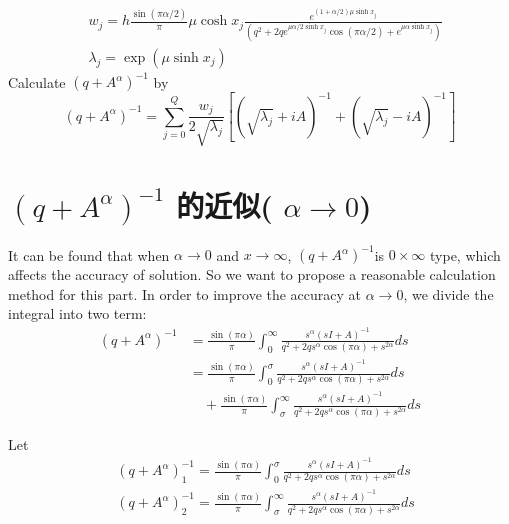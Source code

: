 \begin{breakablealgorithm}
\begin{algorithmic}[1]
		\begin{equation*}
			\begin{aligned}
				&w_j=h\frac{\sin(\pi \alpha/2)}{\pi}\mu\cosh x_j\frac{e^{(1+\alpha/2)\mu\sinh x_j }}{(q^2+2q e^{\mu \alpha/2 \sinh x_j}\cos(\pi\alpha/2)+e^{\mu\alpha\sinh x_j})}\\
				&\lambda_j=\exp(\mu\sinh x_j)
			\end{aligned}
		\end{equation*}
		\ENDIF
		\STATE  Calculate $(q+A^{\alpha})^{-1}$ by 
		\begin{equation}
			(q+{A}^{\alpha})^{-1}=\sum_{j=0}^{Q}\frac{w_j}{2\sqrt{\lambda_j}}\left[\left(\sqrt{\lambda_j}+iA\right)^{-1}+\left(\sqrt{\lambda_j}-iA\right)^{-1}\right]
		\end{equation}
	\end{algorithmic}
\end{breakablealgorithm}



\section{$(q+A^{\alpha})^{-1}$ 的近似( $\alpha \rightarrow 0 $)}

It can be found that when $\alpha \rightarrow 0$ and $x \rightarrow \infty $, $(q+A^{\alpha})^{-1}$is $0\times \infty$ type, which affects the accuracy of solution. So we want to propose a reasonable calculation method for this part. In order to improve the accuracy at $\alpha \rightarrow 0$, we divide the integral into two term:
\begin{equation}
	\begin{aligned}
		(q+{A}^{\alpha})^{-1}&=\frac{\sin(\pi \alpha)}{\pi}\int_0^{\infty}\frac{s^{\alpha}(s{I}+{A})^{-1}}{q^2+2qs^{\alpha}\cos(\pi\alpha)+s^{2\alpha}}ds\\
		&=\frac{\sin(\pi \alpha)}{\pi}\int_0^{\sigma}\frac{s^{\alpha}(s{I}+{A})^{-1}}{q^2+2qs^{\alpha}\cos(\pi\alpha)+s^{2\alpha}}ds\\
		&\quad +\frac{\sin(\pi \alpha)}{\pi}\int_{\sigma}^{\infty}\frac{s^{\alpha}(s{I}+{A})^{-1}}{q^2+2qs^{\alpha}\cos(\pi\alpha)+s^{2\alpha}}ds
	\end{aligned}
	\label{jg_q}
\end{equation}

Let
\begin{equation}
	\begin{aligned}
		&(q+A^{\alpha})^{-1}_1=\frac{\sin(\pi \alpha)}{\pi}\int_0^{\sigma}\frac{s^{\alpha}(s{I}+{A})^{-1}}{q^2+2qs^{\alpha}\cos(\pi\alpha)+s^{2\alpha}}ds\\
		&(q+A^{\alpha})^{-1}_2=\frac{\sin(\pi \alpha)}{\pi}\int_{\sigma}^{\infty}\frac{s^{\alpha}(s{I}+{A})^{-1}}{q^2+2qs^{\alpha}\cos(\pi\alpha)+s^{2\alpha}}ds
	\end{aligned}
\end{equation}

